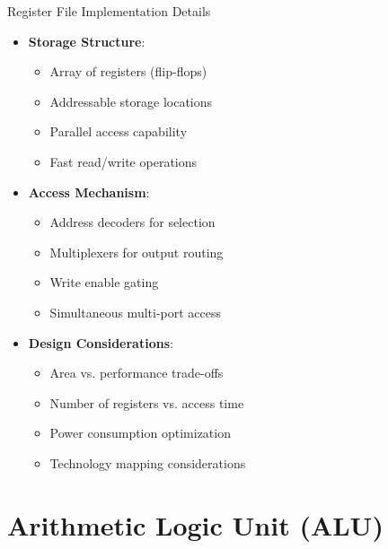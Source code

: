 \documentclass[aspectratio=169,11pt]{beamer}
\newcommand{\concept}[1]{\textbf{\color{accentcolor}#1}}
\begin{document}
\begin{frame}{Register File Implementation Details}
\begin{itemize}
\item \concept{Storage Structure}:
\begin{itemize}
\item Array of registers (flip-flops)
\item Addressable storage locations
\item Parallel access capability
\item Fast read/write operations
\end{itemize}
\vspace{0.5cm}
\item \concept{Access Mechanism}:
\begin{itemize}
\item Address decoders for selection
\item Multiplexers for output routing
\item Write enable gating
\item Simultaneous multi-port access
\end{itemize}
\vspace{0.3cm}
\item \concept{Design Considerations}:
\begin{itemize}
\item Area vs. performance trade-offs
\item Number of registers vs. access time
\item Power consumption optimization
\item Technology mapping considerations
\end{itemize}
\end{itemize}
\end{frame}

\section{Arithmetic Logic Unit (ALU)}
\end{document}
